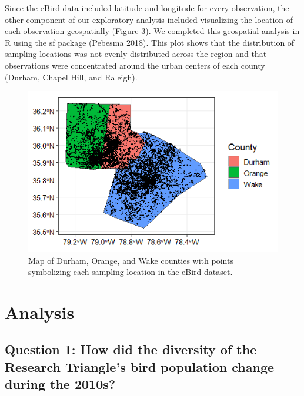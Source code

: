 \documentclass[
  12pt,
]{article}
\begin{document}
Since the eBird data included latitude and longitude for every
observation, the other component of our exploratory analysis included
visualizing the location of each observation geospatially (Figure 3). We
completed this geospatial analysis in R using the sf package (Pebesma
2018). This plot shows that the distribution of sampling locations was
not evenly distributed across the region and that observations were
concentrated around the urban centers of each county (Durham, Chapel
Hill, and Raleigh).

\begin{figure}
\centering
\includegraphics{./Output/EDA_geospatial_plot.png}
\caption{Map of Durham, Orange, and Wake counties with points
symbolizing each sampling location in the eBird dataset.}
\end{figure}

\newpage

\hypertarget{analysis}{%
\section{Analysis}\label{analysis}}

\hypertarget{question-1-how-did-the-diversity-of-the-research-triangles-bird-population-change-during-the-2010s}{%
\subsection{Question 1: How did the diversity of the Research Triangle's
bird population change during the
2010s?}\label{question-1-how-did-the-diversity-of-the-research-triangles-bird-population-change-during-the-2010s}}
\end{document}
